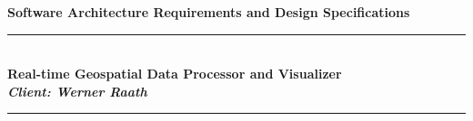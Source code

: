 \documentclass[a4paper,12pt, margin=1.5in]{article}
\begin{document}
	
\begin{titlepage}
	\newcommand{\HRule}{\rule{\linewidth}{0.5mm}} %

	\center %
	 
	

	
	{ \huge \bfseries Software Architecture Requirements and Design Specifications}\\\HRule \\[0.4cm] %
	\Large\textbf{Real-time Geospatial Data Processor and Visualizer} \\
	\small \emph{\textbf{Client: Werner Raath}}
	\HRule \\[1.5cm]
	 

\end{titlepage}
\end{document}
